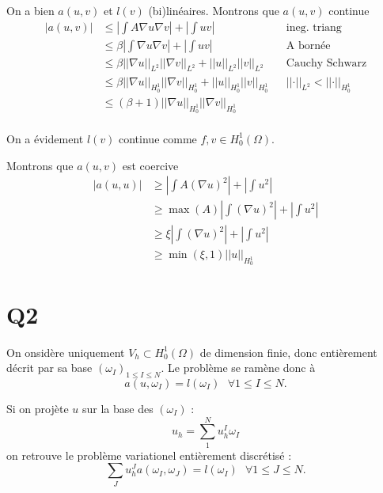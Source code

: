 \documentclass[11pt]{article}
\newcommand{\ms}{~~~}
\newcommand{\norm}[1]{\left|\left|#1\right|\right|}
\begin{document}
On a bien $a(u,v)$ et $l(v)$ (bi)linéaires. Montrons que $a(u,v)$ continue 
\begin{align}
  \label{eq:ac}
  |a(u,v)| &\leq \left| \int A \nabla u \nabla v \right| + \left| \int u v \right| && \mbox{ineg. triang} \\
           &\leq \beta \left| \int \nabla u \nabla v \right| + \left| \int u v \right| && \mbox{A bornée} \\
           &\leq \beta \norm{\nabla u}_{L^2} \norm{\nabla v}_{L^2} + \norm{u}_{L^2}\norm{v}_{L^2} && \mbox{Cauchy Schwarz} \\
           &\leq \beta \norm{\nabla u}_{H^1_0} \norm{\nabla v}_{H^1_0} + \norm{u}_{H^1_0}\norm{v}_{H^1_0} && \norm{\cdot}_{L^2}<\norm{\cdot}_{H^1_0} \\
           &\leq (\beta+1) \norm{\nabla u}_{H^1_0} \norm{\nabla v}_{H^1_0}   \\
\end{align}

On a évidement $l(v)$ continue comme $f, v \in H^1_0(\Omega)$. 

Montrons que $a(u,v)$ est coercive
\begin{align}
  \label{eq:co}
  |a(u,u)| &\geq \left|\int A (\nabla u)^2 \right| + \left|\int u^2 \right| \\
           &\geq \max(A) \left|\int (\nabla u)^2 \right| + \left|\int u^2 \right| \\
           &\geq \xi \left|\int (\nabla u)^2 \right| + \left|\int u^2 \right| \\
           &\geq \min(\xi,1) \norm{u}_{H^1_0}
\end{align}

\section{Q2}

On onsidère uniquement $V_h \subset H^1_0(\Omega)$ de dimension finie, donc entièrement décrit par sa base $(\omega_I)_{1\leq I \leq N}$. Le problème se ramène donc à
\begin{equation}
  a(u,\omega_I) = l(\omega_I) \ms \forall 1\leq I\leq N.
\end{equation}

Si on projète $u$ sur la base des $(\omega_I)$ :
\begin{equation}
  u_h = \sum_{1}^{N} u_h^I \omega_I
\end{equation}
on retrouve le problème variationel entièrement discrétisé :
\begin{equation}
  \sum_J u_h^J a(\omega_I, \omega_J) = l(\omega_I) \ms \forall  1\leq J\leq N.   
\end{equation}
\end{document}
